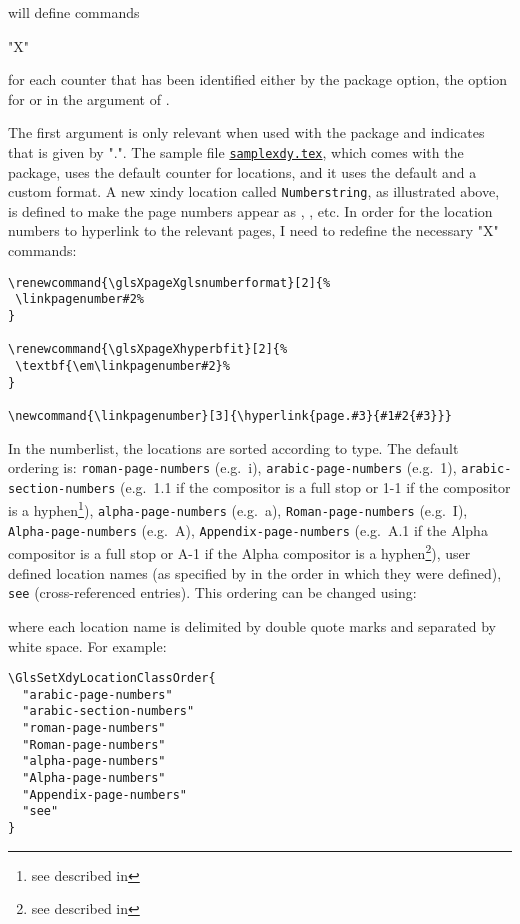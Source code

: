 \documentclass[report]{nlctdoc}
\newcommand*{\samplefile}[1]{\hyperref[ex:sample#1]{\texttt{sample#1.tex}}}
\begin{document}
 will define commands
\begin{definition}
"X"
\end{definition}
for each counter that has been identified either by the
 package option, the  option for
 or in the argument of .

The first argument  is only relevant when used with
the  package and indicates that 
is given by ".". The sample
file \samplefile{xdy}, which comes with the 
package, uses the default  counter for locations, and it
uses the default  and a custom 
format. A new \gls{xindy} location called \texttt{Numberstring}, as
illustrated above, is defined to make the page numbers appear as
, , etc. In order for the location numbers to
hyperlink to the relevant pages, I need to redefine the necessary
"X" commands:
\begin{verbatim}
\renewcommand{\glsXpageXglsnumberformat}[2]{%
 \linkpagenumber#2%
}

\renewcommand{\glsXpageXhyperbfit}[2]{%
 \textbf{\em\linkpagenumber#2}%
}

\newcommand{\linkpagenumber}[3]{\hyperlink{page.#3}{#1#2{#3}}}
\end{verbatim}

In the \gls{numberlist}, the locations are sorted according to
type. The default ordering is: \texttt{roman-page-numbers} (e.g.\
i), \texttt{arabic-page-numbers} (e.g.\ 1),
\texttt{arabic-section-numbers} (e.g.\ 1.1 if the compositor is a
full stop or 1-1 if the compositor is a hyphen\footnote{see
 described in }),
\texttt{alpha-page-numbers} (e.g.\ a), \texttt{Roman-page-numbers}
(e.g.\ I), \texttt{Alpha-page-numbers} (e.g.\ A),
\texttt{Appendix-page-numbers} (e.g.\ A.1 if the Alpha compositor is
a full stop or A-1 if the Alpha compositor is a hyphen\footnote{see
\ics{setAlphaCompositor} described in
}), user defined location names (as
specified by  in the order in which they were
defined), \texttt{see} (cross-referenced entries). This ordering can
be changed using:

\DescribeMacro{\GlsSetXdyLocationClassOrder}
\begin{definition}
\end{definition}
where each location name is delimited by double quote marks and
separated by white space. For example:
\begin{verbatim}
\GlsSetXdyLocationClassOrder{
  "arabic-page-numbers"
  "arabic-section-numbers"
  "roman-page-numbers"
  "Roman-page-numbers"
  "alpha-page-numbers"
  "Alpha-page-numbers"
  "Appendix-page-numbers"
  "see"
}
\end{verbatim}
\end{document}
